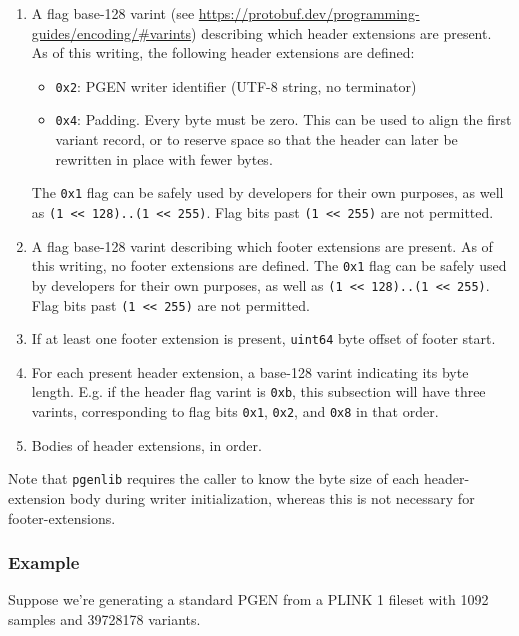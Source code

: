 \documentclass[8pt]{article}
\begin{document}
\begin{enumerate}
\item A flag base-128 varint (see
  \url{https://protobuf.dev/programming-guides/encoding/#varints}) describing
  which header extensions are present.  As of this writing, the following
  header extensions are defined:
  \begin{itemize}
    \item \texttt{0x2}: PGEN writer identifier (UTF-8 string, no terminator)
    \item \texttt{0x4}: Padding.  Every byte must be zero.  This can be used
      to align the first variant record, or to reserve space so that the
      header can later be rewritten in place with fewer bytes.
  \end{itemize}
  The \texttt{0x1} flag can be safely used by developers for their own
  purposes, as well as \texttt{(1 << 128)..(1 << 255)}.  Flag bits past
  \texttt{(1 << 255)} are not permitted.
\item A flag base-128 varint describing which footer extensions are present.
  As of this writing, no footer extensions are defined.  The \texttt{0x1} flag
  can be safely used by developers for their own purposes, as well as
  \texttt{(1 << 128)..(1 << 255)}.  Flag bits past \texttt{(1 << 255)} are
  not permitted.
\item If at least one footer extension is present, \texttt{uint64} byte offset
  of footer start.
\item For each present header extension, a base-128 varint indicating its byte
  length.  E.g. if the header flag varint is \texttt{0xb}, this subsection will
  have three varints, corresponding to flag bits \texttt{0x1}, \texttt{0x2},
  and \texttt{0x8} in that order.
\item Bodies of header extensions, in order.
\end{enumerate}

Note that \texttt{pgenlib} requires the caller to know the byte size of each
header-extension body during writer initialization, whereas this is not
necessary for footer-extensions.

\subsubsection{Example}

Suppose we're generating a standard PGEN from a PLINK 1 fileset with 1092
samples and 39728178 variants.
\end{document}
